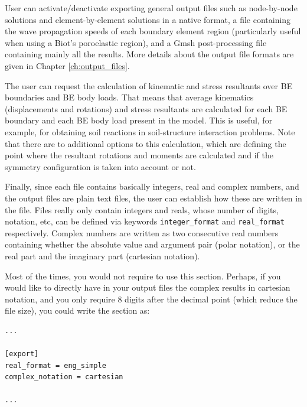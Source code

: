 \documentclass[a4paper,fleqn]{book}
\begin{document}
User can activate/deactivate exporting general output files such as node-by-node solutions and element-by-element solutions in a native format, a file containing the wave propagation speeds of each boundary element region (particularly useful when using a Biot's poroelastic region), and a Gmsh post-processing file containing mainly all the results. More details about the output file formats are given in Chapter \ref{ch:output_files}.

The user can request the calculation of kinematic and stress resultants over BE boundaries and BE body loads. That means that average kinematics (displacements and rotations) and stress resultants are calculated for each BE boundary and each BE body load present in the model. This is useful, for example, for obtaining soil reactions in soil-structure interaction problems. Note that there are to additional options to this calculation, which are defining the point where the resultant rotations and moments are calculated and if the symmetry configuration is taken into account or not.

Finally, since each file contains basically integers, real and complex numbers, and the output files are plain text files, the user can establish how these are written in the file. Files really only contain integers and reals, whose number of digits, notation, etc, can be defined via keywords \texttt{integer\_format} and \texttt{real\_format} respectively. Complex numbers are written as two consecutive real numbers containing whether the absolute value and argument pair (polar notation), or the real part and the imaginary part (cartesian notation).

Most of the times, you would not require to use this section. Perhaps, if you would like to directly have in your output files the complex results in cartesian notation, and you only require 8 digits after the decimal point (which reduce the file size), you could write the section as:
\begin{Verbatim}[frame=single, fontsize=\small, label=input.dat]
...

[export]
real_format = eng_simple
complex_notation = cartesian

...
\end{Verbatim}
\end{document}
